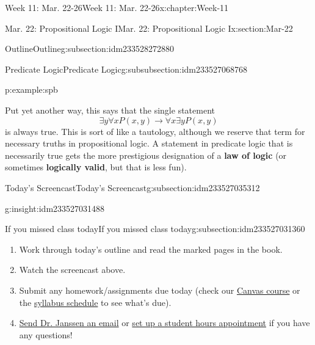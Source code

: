 \documentclass[oneside,10pt,]{book}
\newcommand{\terminology}[1]{\textbf{#1}}
\numberwithin{equation}{section}
\def\imp{\to}
\newcommand{\imp}{\rightarrow}
\begin{document}
\begin{chapterptx}{Week 11: Mar. 22-26}{}{Week 11: Mar. 22-26}{}{}{x:chapter:Week-11}
\begin{sectionptx}{Mar. 22: Propositional Logic I}{}{Mar. 22: Propositional Logic I}{}{}{x:section:Mar-22}
\begin{subsectionptx}{Outline}{}{Outline}{}{}{g:subsection:idm233528272880}
\begin{subsubsectionptx}{Predicate Logic}{}{Predicate Logic}{}{}{g:subsubsection:idm233527068768}
\begin{example}{}{p:example:spb}
\begin{sidebyside}{1}{0}{0}{0}
\begin{sbspanel}{1}
{}%
\end{sbspanel}%
\end{sidebyside}%
\par
Put yet another way, this says that the single statement%
\begin{equation*}
\exists y \forall x P(x,y) \imp \forall x \exists y P(x,y)
\end{equation*}
is always true. This is sort of like a tautology, although we reserve that term for necessary truths in propositional logic. A statement in predicate logic that is necessarily true gets the more prestigious designation of a \terminology{law of logic}  (or sometimes \terminology{logically valid},  but that is less fun).%
\end{example}
\end{subsubsectionptx}
\end{subsectionptx}
%
%
\typeout{************************************************}
\typeout{************************************************}
%
\begin{subsectionptx}{Today's Screencast}{}{Today's Screencast}{}{}{g:subsection:idm233527035312}
\begin{insight}{}{g:insight:idm233527031488}%
\end{insight}
\end{subsectionptx}
%
%
\typeout{************************************************}
\typeout{************************************************}
%
\begin{subsectionptx}{If you missed class today}{}{If you missed class today}{}{}{g:subsection:idm233527031360}
%
\begin{enumerate}
\item{}Work through today's outline and read the marked pages in the book.%
\item{}Watch the screencast above.%
\item{}Submit any homework\slash{}assignments due today (check our \href{https://dordt.instructure.com/courses/3110050}{Canvas course} or the \href{https://prof.mkjanssen.org/ds/index.html\#schedule}{syllabus schedule} to see what's due).%
\item{}\href{mailto:mike.janssen@dordt.edu}{Send Dr. Janssen an email} or \href{https://calendly.com/mkjanssen/student-hours}{set up a student hours appointment} if you have any questions!%
\end{enumerate}

\end{subsectionptx}
\end{sectionptx}
\end{chapterptx}
\end{document}
